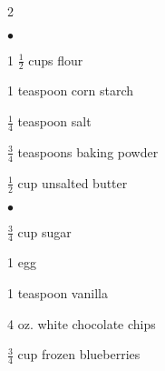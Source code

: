 \newcommand{\squishlistthree}{
 \begin{list}{$\bullet$}
  { \setlength{\itemsep}{-1pt}
     \setlength{\parsep}{0pt}
    \setlength{\topsep}{0pt}
    \setlength{\partopsep}{0pt}
    \setlength{\leftmargin}{2em}
    \setlength{\labelwidth}{1em}
    \setlength{\labelsep}{0.5em} } }
\vspace{-1cm}
\vspace{-0.7cm}
\begin{multicols}{2}
\squishlistthree
  \item 1 \(\frac{1}{2}\) cups flour
  \item 1 teaspoon corn starch
  \item \(\frac{1}{4}\) teaspoon salt
  \item \(\frac{3}{4}\) teaspoons baking powder
  \item \(\frac{1}{2}\) cup unsalted butter
\end{list}
\vfill\null
\columnbreak
\squishlistthree
  \item \(\frac{3}{4}\) cup sugar
  \item 1 egg
  \item 1 teaspoon vanilla
  \item 4 oz. white chocolate chips
  \item \(\frac{3}{4}\) cup frozen blueberries
\end{list}
\vfill\null
\end{multicols}

